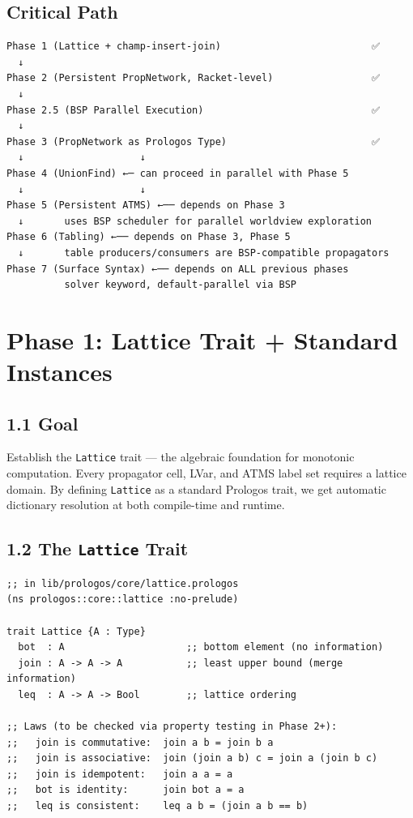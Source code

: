 \documentclass[11pt]{article}
\begin{document}
\subsection{Critical Path}
\label{sec:org8ba2608}

\begin{verbatim}
Phase 1 (Lattice + champ-insert-join)                          ✅
  ↓
Phase 2 (Persistent PropNetwork, Racket-level)                 ✅
  ↓
Phase 2.5 (BSP Parallel Execution)                             ✅
  ↓
Phase 3 (PropNetwork as Prologos Type)                         ✅
  ↓                    ↓
Phase 4 (UnionFind) ←─ can proceed in parallel with Phase 5
  ↓                    ↓
Phase 5 (Persistent ATMS) ←── depends on Phase 3
  ↓       uses BSP scheduler for parallel worldview exploration
Phase 6 (Tabling) ←── depends on Phase 3, Phase 5
  ↓       table producers/consumers are BSP-compatible propagators
Phase 7 (Surface Syntax) ←── depends on ALL previous phases
          solver keyword, default-parallel via BSP
\end{verbatim}
\section{Phase 1: Lattice Trait + Standard Instances}
\label{sec:orgc2e2189}

\subsection{1.1 Goal}
\label{sec:orge61fe58}

Establish the \texttt{Lattice} trait — the algebraic foundation for monotonic
computation. Every propagator cell, LVar, and ATMS label set requires
a lattice domain. By defining \texttt{Lattice} as a standard Prologos trait,
we get automatic dictionary resolution at both compile-time and runtime.
\subsection{1.2 The \texttt{Lattice} Trait}
\label{sec:orga06b648}

\begin{verbatim}
;; in lib/prologos/core/lattice.prologos
(ns prologos::core::lattice :no-prelude)

trait Lattice {A : Type}
  bot  : A                     ;; bottom element (no information)
  join : A -> A -> A           ;; least upper bound (merge information)
  leq  : A -> A -> Bool        ;; lattice ordering

;; Laws (to be checked via property testing in Phase 2+):
;;   join is commutative:  join a b = join b a
;;   join is associative:  join (join a b) c = join a (join b c)
;;   join is idempotent:   join a a = a
;;   bot is identity:      join bot a = a
;;   leq is consistent:    leq a b = (join a b == b)
\end{verbatim}
\end{document}
